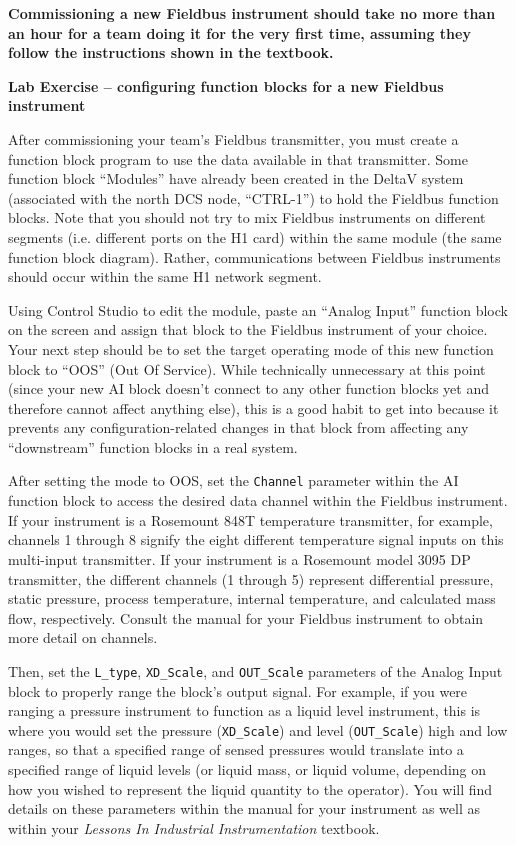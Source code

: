 \vskip 10pt

{\bf Commissioning a new Fieldbus instrument should take no more than an hour for a team doing it for the very first time, assuming they follow the instructions shown in the textbook.}






\vfil \eject

\noindent
{\bf Lab Exercise -- configuring function blocks for a new Fieldbus instrument}

\vskip 5pt

After commissioning your team's Fieldbus transmitter, you must create a function block program to use the data available in that transmitter.  Some function block ``Modules'' have already been created in the DeltaV system (associated with the north DCS node, ``CTRL-1'') to hold the Fieldbus function blocks.  Note that you should not try to mix Fieldbus instruments on different segments (i.e. different ports on the H1 card) within the same module (the same function block diagram).  Rather, communications between Fieldbus instruments should occur within the same H1 network segment.

Using Control Studio to edit the module, paste an ``Analog Input'' function block on the screen and assign that block to the Fieldbus instrument of your choice.  Your next step should be to set the target operating mode of this new function block to ``OOS'' (Out Of Service).  While technically unnecessary at this point (since your new AI block doesn't connect to any other function blocks yet and therefore cannot affect anything else), this is a good habit to get into because it prevents any configuration-related changes in that block from affecting any ``downstream'' function blocks in a real system.

After setting the mode to OOS, set the {\tt Channel} parameter within the AI function block to access the desired data channel within the Fieldbus instrument.  If your instrument is a Rosemount 848T temperature transmitter, for example, channels 1 through 8 signify the eight different temperature signal inputs on this multi-input transmitter.  If your instrument is a Rosemount model 3095 DP transmitter, the different channels (1 through 5) represent differential pressure, static pressure, process temperature, internal temperature, and calculated mass flow, respectively.  Consult the manual for your Fieldbus instrument to obtain more detail on channels.

Then, set the {\tt L\_type}, {\tt XD\_Scale}, and {\tt OUT\_Scale} parameters of the Analog Input block to properly range the block's output signal.  For example, if you were ranging a pressure instrument to function as a liquid level instrument, this is where you would set the pressure ({\tt XD\_Scale}) and level ({\tt OUT\_Scale}) high and low ranges, so that a specified range of sensed pressures would translate into a specified range of liquid levels (or liquid mass, or liquid volume, depending on how you wished to represent the liquid quantity to the operator).  You will find details on these parameters within the manual for your instrument as well as within your {\it Lessons In Industrial Instrumentation} textbook.


